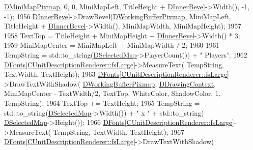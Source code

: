 \begin{DoxyCode}
      \hyperlink{classCApplicationData_abe3af81659ead5113b7b2f165a88e737}{DMiniMapPixmap}, 0, 0, MiniMapLeft, TitleHeight + \hyperlink{classCApplicationData_a29a687c44dceb9e87a56d96612d59ab5}{DInnerBevel}->Width(), -1, -1);
1956     \hyperlink{classCApplicationData_a29a687c44dceb9e87a56d96612d59ab5}{DInnerBevel}->DrawBevel(\hyperlink{classCApplicationData_afa34cf2780f38dd28c0c811e69d60a97}{DWorkingBufferPixmap}, MiniMapLeft, TitleHeight + 
      \hyperlink{classCApplicationData_a29a687c44dceb9e87a56d96612d59ab5}{DInnerBevel}->Width(), MiniMapWidth, MiniMapHeight);
1957     
1958     TextTop = TitleHeight + MiniMapHeight + \hyperlink{classCApplicationData_a29a687c44dceb9e87a56d96612d59ab5}{DInnerBevel}->Width() * 3;
1959     MiniMapCenter = MiniMapLeft + MiniMapWidth / 2;
1960     
1961     TempString = std::to\_string(\hyperlink{classCApplicationData_abf74a18394e479b7090a8f9a55608867}{DSelectedMap}->PlayerCount()) + \textcolor{stringliteral}{" Players"};
1962     \hyperlink{classCApplicationData_afde9247d0a3ea87393ec86dcdb1e8274}{DFonts}[\hyperlink{classCUnitDescriptionRenderer_a3ea4cd83b6dd9533ab3abb953a7da35aaf467097fe4f4811a5e2f1959c86e071d}{CUnitDescriptionRenderer::fsLarge}]->MeasureText(
      TempString, TextWidth, TextHeight);
1963     \hyperlink{classCApplicationData_afde9247d0a3ea87393ec86dcdb1e8274}{DFonts}[\hyperlink{classCUnitDescriptionRenderer_a3ea4cd83b6dd9533ab3abb953a7da35aaf467097fe4f4811a5e2f1959c86e071d}{CUnitDescriptionRenderer::fsLarge}]->DrawTextWithShadow(
      \hyperlink{classCApplicationData_afa34cf2780f38dd28c0c811e69d60a97}{DWorkingBufferPixmap}, \hyperlink{classCApplicationData_aa6c5bea9bdcc64398e5a3f693661d37c}{DDrawingContext}, MiniMapCenter - TextWidth/2, 
      TextTop, WhiteColor, ShadowColor, 1, TempString);
1964     TextTop += TextHeight;
1965     TempString = std::to\_string(\hyperlink{classCApplicationData_abf74a18394e479b7090a8f9a55608867}{DSelectedMap}->Width()) + \textcolor{stringliteral}{" x "} + std::to\_string(
      \hyperlink{classCApplicationData_abf74a18394e479b7090a8f9a55608867}{DSelectedMap}->Height());
1966     \hyperlink{classCApplicationData_afde9247d0a3ea87393ec86dcdb1e8274}{DFonts}[\hyperlink{classCUnitDescriptionRenderer_a3ea4cd83b6dd9533ab3abb953a7da35aaf467097fe4f4811a5e2f1959c86e071d}{CUnitDescriptionRenderer::fsLarge}]->MeasureText(
      TempString, TextWidth, TextHeight);
1967     \hyperlink{classCApplicationData_afde9247d0a3ea87393ec86dcdb1e8274}{DFonts}[\hyperlink{classCUnitDescriptionRenderer_a3ea4cd83b6dd9533ab3abb953a7da35aaf467097fe4f4811a5e2f1959c86e071d}{CUnitDescriptionRenderer::fsLarge}]->DrawTextWithShadow(

\end{DoxyCode}
